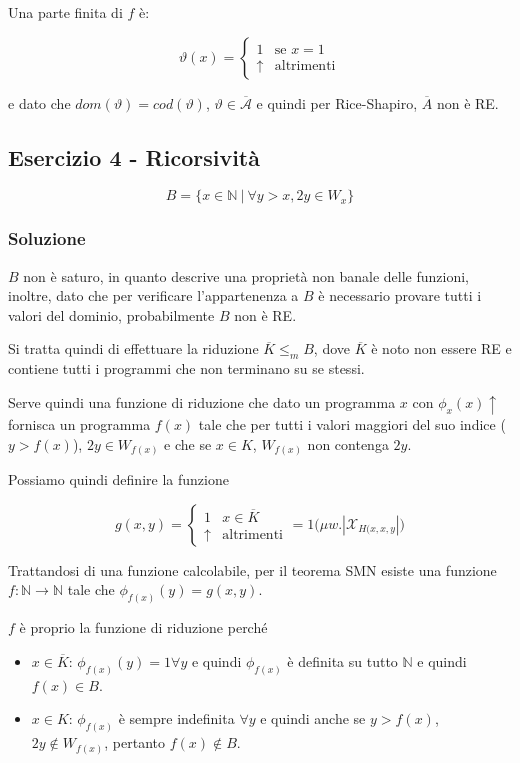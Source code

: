 Una parte finita di $f$ è:

$$
\vartheta(x) = \begin{cases}
1 &\text{se } x=1 \\
\uparrow &\text{altrimenti}
\end{cases}
$$

e dato che $dom(\vartheta) = cod(\vartheta)$, $\vartheta \in \overline{\mathcal{A}}$ e quindi per Rice-Shapiro, $\overline{A}$ non è RE.


\subsection{Esercizio 4 - Ricorsività  }

$$
B = \{ x \in \mathbb{N} \: | \: \forall y > x, 2y \in W_x \}
$$

\subsubsection{Soluzione}

$B$ non è saturo, in quanto descrive una proprietà non banale delle funzioni, inoltre, dato che per verificare l'appartenenza a $B$ è necessario provare tutti i valori del dominio, probabilmente $B$ non è RE.

Si tratta quindi di effettuare la riduzione $\overline{K} \leq_m B$, dove $\overline{K}$ è noto non essere RE e contiene tutti i programmi che non terminano su se stessi.

Serve quindi una funzione di riduzione che dato un programma $x$ con $\phi_x(x) \uparrow$ fornisca un programma $f(x)$ tale che per tutti i valori maggiori del suo indice ($y > f(x)$), $2y \in W_{f(x)}$ e che se $x \in K$, $W_{f(x)}$ non contenga $2y$.

Possiamo quindi definire la funzione

$$
g(x,y) = \begin{cases}
1 &x \in \overline{K} \\
\uparrow &\text{altrimenti}
\end{cases} = 1\bigg(\mu w. |\mathcal{X}_{H(x,x, y}|\bigg)
$$

Trattandosi di una funzione calcolabile, per il teorema SMN esiste una funzione $f : \mathbb{N} \rightarrow \mathbb{N}$ tale che $\phi_{f(x)}(y) = g(x,y)$.

$f$ è proprio la funzione di riduzione perché

\begin{itemize}
	\item $x \in \overline{K}$: $\phi_{f(x)}(y) = 1 \forall y$ e quindi $\phi_{f(x)}$ è definita su tutto $\mathbb{N}$ e quindi $f(x) \in B$.
	\item $x \in K$: $\phi_{f(x)}$ è sempre indefinita $\forall y$ e quindi anche se $y > f(x)$, $2y \notin W_{f(x)}$, pertanto $f(x) \notin B$.
\end{itemize}

